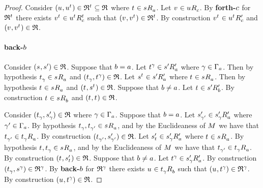 \begin{proof}
Consider $(\kStateU, \kStateU[\kStateT]) \in \refinement^{\kStateT} \subseteq \refinement$ where $\kStateT \in \kSuccessorsA{\kStateS}$.
Let $\kStateV \in \kSuccessorsC{\kStateU}$.
By {\bf forth-$\agentC$} for $\refinement^{\kStateT}$ there exists $\kStateV[\kStateT] \in \kSuccessorsC[\kStateT]{\kStateU[\kStateT]}$ such that $(\kStateV, \kStateV[\kStateT]) \in \refinement^{\kStateT}$.
By construction $\kStateV[\kStateT] \in \kSuccessorsPC{\kStateU[\kStateT]}$ and $(\kStateV, \kStateV[\kStateT]) \in \refinement$.

\paragraph{back-$\agentB$}

Consider $(\kStateS, \kStateSP) \in \refinement$.
Suppose that $\agentB = \agentA$.
Let $\kStateT[\gamma] \in \kSuccessorsPA{\kStateSP}$ where $\gamma \in \Gamma_\agentA$.
Then by hypothesis $\kStateT_\gamma \in \kSuccessorsA{\kStateS}$ and $(\kStateT_\gamma, \kStateT[\gamma]) \in \refinement$.
Let $\kStateS[\kStateT] \in \kSuccessorsPA{\kStateSP}$ where $\kStateT \in \kSuccessorsA{\kStateS}$.
Then by hypothesis $\kStateT \in \kSuccessorsA{\kStateS}$ and $(\kStateT, \kStateS[\kStateT]) \in \refinement$.
Suppose that $\agentB \neq \agentA$.
Let $\kStateT \in \kSuccessorsPB{\kStateSP}$.
By construction $\kStateT \in \kSuccessorsB{\kStateS}$ and $(\kStateT, \kStateT) \in \refinement$.

Consider $(\kStateT_\gamma, \kStateSP_\gamma) \in \refinement$ where $\gamma \in \Gamma_\agentA$.
Suppose that $\agentB = \agentA$.
Let $\kStateSP_{\gamma'} \in \kSuccessorsPA{\kStateSP_\gamma}$ where $\gamma' \in \Gamma_\agentA$.
By hypothesis $\kStateT_{\gamma}, \kStateT_{\gamma'} \in \kSuccessorsA{\kStateS}$, and by the Euclideaness of $\kModel$ we have that $\kStateT_{\gamma'} \in \kSuccessorsA{\kStateT_\gamma}$.
By construction $(\kStateT_{\gamma'}, \kStateSP_{\gamma'}) \in \refinement$.
Let $\kStateSP_{\kStateT} \in \kSuccessorsPA{\kStateSP_\gamma}$ where $\kStateT \in \kSuccessorsA{\kStateS}$.
By hypothesis $\kStateT, \kStateT_{\gamma} \in \kSuccessorsA{\kStateS}$, and by the Euclideaness of $\kModel$ we have that $\kStateT_{\gamma'} \in \kSuccessorsA{\kStateT_\gamma}$.
By construction $(\kStateT, \kStateSP_{\kStateT}) \in \refinement$.
Suppose that $\agentB \neq \agentA$.
Let $\kStateT[\gamma] \in \kSuccessorsPA{\kStateSP_\gamma}$.
By construction $(\kStateT_\gamma, \kStateS[\gamma]) \in \refinement^\gamma$.
By {\bf back-$\agentB$} for $\refinement^\gamma$ there exists $\kStateU \in \kSuccessorsB{\kStateT_\gamma}$ such that $(\kStateU, \kStateT[\gamma]) \in \refinement^\gamma$.
By construction $(\kStateU, \kStateT[\gamma]) \in \refinement$.


\end{proof}

